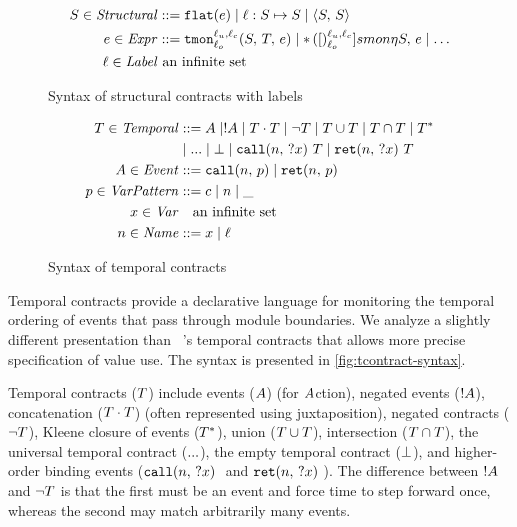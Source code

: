 \FloatBarrier
\begin{figure}
  \begin{align*}
    S \in \mathit{Structural} &::= {\tt flat}(e) \mid \ell : S \mapsto S \mid \langle S,\, S\rangle
\\
    e \in \mathit{Expr} &::= {\tt tmon}{^{\ell_u,\ell_c}_{\ell_o}}({S,\,T,\,e})
                    \mid {\tt *}{\,}({[})^{\ell_u,\ell_c}_{\ell_o}]{smon}{\eta}{S,\, e}
                    \mid \ldots
\\
\ell \in \mathit{Label}&\text{ an infinite set}
  \end{align*}
  \caption{Syntax of structural contracts with labels}
  \label{fig:scontract-syntax}
\end{figure}

\begin{figure}
  \begin{align*}
 T \in \mathit{Temporal} &::=
      A \mid ! A
 \mid T \cdot T
 \mid \neg T
 \mid T \cup T
 \mid T \cap T
 \mid T^* \\
&\mid {\tt ...} \mid \bot
 \mid {\tt call}(n,\, {\tt ?}x)\ T
 \mid {\tt ret}(n,\, {\tt ?}x)\ T
\\
A \in \mathit{Event} &::= {\tt call}(n,\, p) \mid {\tt ret}(n,\, p) \\
p \in \mathit{VarPattern} &::= c \mid n \mid \_ \\
x \in \mathit{Var} &\quad\text{an infinite set} \\
n \in \mathit{Name} &::= x \mid \ell
  \end{align*}
  \caption{Syntax of temporal contracts}
  \label{fig:tcontract-syntax}
\end{figure}

Temporal contracts provide a declarative language for monitoring the temporal ordering of events that pass through module boundaries.
%
We analyze a slightly different presentation than ~\citeauthor{ianjohnson:dfm:icfp2011}'s temporal contracts that allows more precise specification of value use.
%
The syntax is presented in \autoref{fig:tcontract-syntax}.

Temporal contracts ($T$) include events ($A$) (for $A$ction), negated events ($! A$), concatenation ($T \cdot T$) (often represented using juxtaposition), negated contracts ($\neg T$), Kleene closure of events ($T^*$), union ($T \cup T$), intersection ($T \cap T$), the universal temporal contract (${\tt ...}$), the empty temporal contract ($\bot$), and higher-order binding events ($\stcall{\mname}{\mvar}$ and $\stret{\mname}{\mvar}$).
%
The difference between $! A$ and $\neg T$ is that the first must be an event and force time to step forward once, whereas the second may match arbitrarily many events.

